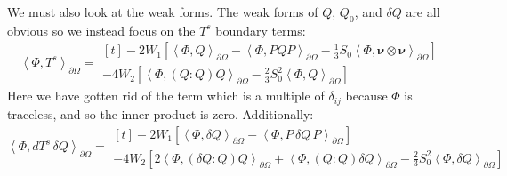 \documentclass[reqno]{article}
\begin{document}
We must also look at the weak forms. 
The weak forms of $Q$, $Q_0$, and $\delta Q$ are all obvious so we instead focus on the $T^s$ boundary terms:
\begin{equation}
    \left<\Phi, T^s \right>_{\partial \Omega}
    =
    \begin{multlined}[t]
        -2 W_1 \left[
            \left<\Phi, Q\right>_{\partial \Omega}
            - \left<\Phi, PQP \right>_{\partial \Omega}
            - \tfrac13 S_0 \left<\Phi, \boldsymbol\nu \otimes \boldsymbol\nu\right>_{\partial \Omega}
        \right] \\
        - 4 W_2 \left[ 
            \left< \Phi, \left(Q : Q\right) Q \right>_{\partial \Omega}
            - \tfrac23 S_0^2 \left< \Phi, Q \right>_{\partial \Omega}
        \right]
    \end{multlined}
\end{equation}
Here we have gotten rid of the term which is a multiple of $\delta_{ij}$ because $\Phi$ is traceless, and so the inner product is zero.
Additionally:
\begin{equation}
    \left<\Phi, dT^s \, \delta Q\right>_{\partial \Omega}
    =
    \begin{multlined}[t]
        -2 W_1 \left[
            \left< \Phi, \delta Q \right>_{\partial \Omega}
            - \left< \Phi, P \, \delta Q \, P \right>_{\partial \Omega}
        \right] \\
        - 4 W_2 \left[ 
            2\left<\Phi, \left( \delta Q : Q \right) Q \right>_{\partial \Omega}
            + \left<\Phi, \left( Q : Q \right) \delta Q \right>_{\partial \Omega}
            - \frac23 S_0^2 \left<\Phi, \delta Q \right>_{\partial \Omega}
        \right] 
    \end{multlined}
\end{equation}
\end{document}

